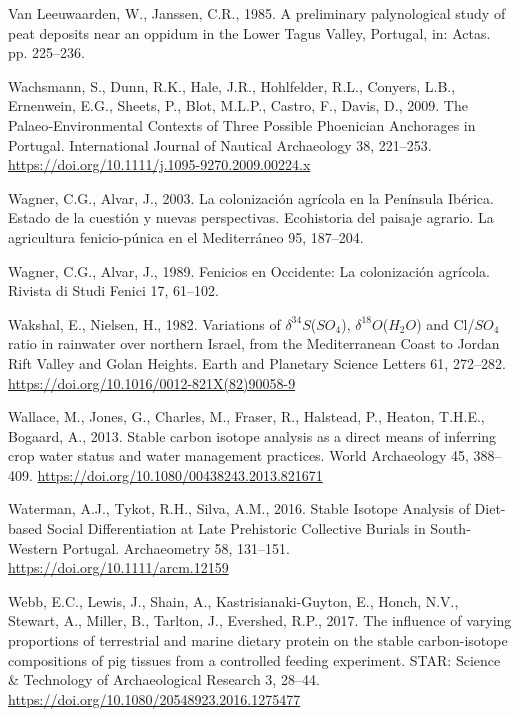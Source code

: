 \documentclass[preprint, 3p, authoryear]{elsarticle} %
\newlength{\cslhangindent}
\newlength{\cslentryspacingunit} %
\newenvironment{CSLReferences}[2] %
 {%
  \setlength{\parindent}{0pt}
  \ifodd #1
  \let\oldpar\par
  \def\par{\hangindent=\cslhangindent\oldpar}
  \fi
  \setlength{\parskip}{#2\cslentryspacingunit}
 }%
 {}
\begin{document}
\begin{CSLReferences}{1}{0}
\leavevmode{}%
Van Leeuwaarden, W., Janssen, C.R., 1985. A preliminary palynological study of peat deposits near an oppidum in the {Lower Tagus Valley}, {Portugal}, in: Actas. pp. 225--236.

\leavevmode{}%
Wachsmann, S., Dunn, R.K., Hale, J.R., Hohlfelder, R.L., Conyers, L.B., Ernenwein, E.G., Sheets, P., Blot, M.L.P., Castro, F., Davis, D., 2009. The {Palaeo}‐{Environmental Contexts} of {Three Possible Phoenician Anchorages} in {Portugal}. International Journal of Nautical Archaeology 38, 221--253. \url{https://doi.org/10.1111/j.1095-9270.2009.00224.x}

\leavevmode{}%
Wagner, C.G., Alvar, J., 2003. La colonización agrícola en la {Península Ibérica}. {Estado} de la cuestión y nuevas perspectivas. Ecohistoria del paisaje agrario. La agricultura fenicio-púnica en el Mediterráneo 95, 187--204.

\leavevmode{}%
Wagner, C.G., Alvar, J., 1989. Fenicios en {Occidente}: La colonización agrícola. Rivista di Studi Fenici 17, 61--102.

\leavevmode{}%
Wakshal, E., Nielsen, H., 1982. Variations of {\(\delta ^{34}S\)}({\(SO_{4}\)}), {\(\delta ^{18}O\)}({\(H_{2}O\)}) and {Cl}/{\(SO_{4}\)} ratio in rainwater over northern {Israel}, from the {Mediterranean Coast} to {Jordan Rift Valley} and {Golan Heights}. Earth and Planetary Science Letters 61, 272--282. \url{https://doi.org/10.1016/0012-821X(82)90058-9}

\leavevmode{}%
Wallace, M., Jones, G., Charles, M., Fraser, R., Halstead, P., Heaton, T.H.E., Bogaard, A., 2013. Stable carbon isotope analysis as a direct means of inferring crop water status and water management practices. World Archaeology 45, 388--409. \url{https://doi.org/10.1080/00438243.2013.821671}

\leavevmode{}%
Waterman, A.J., Tykot, R.H., Silva, A.M., 2016. Stable {Isotope Analysis} of {Diet}-based {Social Differentiation} at {Late Prehistoric Collective Burials} in {South}-{Western Portugal}. Archaeometry 58, 131--151. \url{https://doi.org/10.1111/arcm.12159}

\leavevmode{}%
Webb, E.C., Lewis, J., Shain, A., Kastrisianaki-Guyton, E., Honch, N.V., Stewart, A., Miller, B., Tarlton, J., Evershed, R.P., 2017. The influence of varying proportions of terrestrial and marine dietary protein on the stable carbon-isotope compositions of pig tissues from a controlled feeding experiment. STAR: Science \& Technology of Archaeological Research 3, 28--44. \url{https://doi.org/10.1080/20548923.2016.1275477}


\end{CSLReferences}
\end{document}

